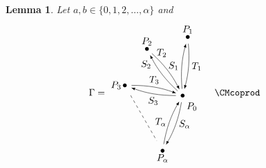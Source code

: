 \documentclass{amsproc}
\newtheorem{lemma}[theorem]{Lemma}
\theoremstyle{definition}
\theoremstyle{remark}
\numberwithin{equation}{section}
\newcommand{\nodeDist}{2}
\newcommand{\labelDist}{0.1}
\begin{document}
\begin{lemma}\label{Eulerian_sum_1}
Let $a,b\in\{0,1,2,\dots,\alpha\}$ and 
\renewcommand{\nodeDist}{2}
\renewcommand{\labelDist}{0.1}
\[\Gamma=
\begin{tikzpicture}[baseline,vertex/.style={anchor=base, circle, fill,minimum size=4pt, inner sep=0pt, outer sep=0pt},auto,
                               edge/.style={->,>=latex, shorten > = 5pt,shorten < = 5pt},
position/.style args={#1:#2 from #3}{
    at=(#3.#1), anchor=#1+180, shift=(#1:#2)
}]

  \node[vertex] (v0) {};
  \node[vertex,position = 85:{\nodeDist} from v0] (v1L) {};
  \node[vertex,position = 127.5:{\nodeDist} from v0] (v2L) {};
  \node[vertex,position = 170:{\nodeDist} from v0] (v3L) {};
  \node[vertex,position = 250:{\nodeDist} from v0] (v4L) {};

  \draw (v0) node[position=310:{\labelDist} from v0] {$P_0$};
  \draw (v1L) node[above] {$P_{1}$};
  \draw (v2L) node[above] {$P_{2}$};
  \draw (v3L) node[left] {$P_{3}$};
  \draw (v4L) node[below] {$P_{\alpha}$};

  \draw[edge] (v0) to [bend left=10] node[left] {$S_{1}$} (v1L);
  \draw[edge] (v1L) to [bend left=10] node[right] {$T_{1}$} (v0);

  \draw[edge] (v0) to [bend left=10] node[above = 10, left = 8] {$S_{2}$} (v2L);
  \draw[edge] (v2L) to [bend left=10] node[above = 18, left = -3] {$T_{2}$} (v0);

  \draw[edge] (v0) to [bend left=10] node[below] {$S_{3}$} (v3L);
  \draw[edge] (v3L) to [bend left=10] node[above] {$T_{3}$} (v0);

  \draw[dashed,shorten > = 10pt, shorten < = 10pt, bend right=10] (v3L) -- (v4L);

  \draw[edge] (v0) to [bend left=10] node[right] {$S_{\alpha}$} (v4L);
  \draw[edge] (v4L) to [bend left=10] node[left] {$T_{\alpha}$} (v0);
\end{tikzpicture}
\quad\CMcoprod\quad
\begin{tikzpicture}[baseline,vertex/.style={anchor=base, circle, fill,minimum size=4pt, inner sep=0pt, outer sep=0pt},auto,
                               edge/.style={->,>=latex, shorten > = 5pt,shorten < = 5pt},
position/.style args={#1:#2 from #3}{
    at=(#3.#1), anchor=#1+180, shift=(#1:#2)
}]


\end{tikzpicture}\]
\end{lemma}
\end{document}
